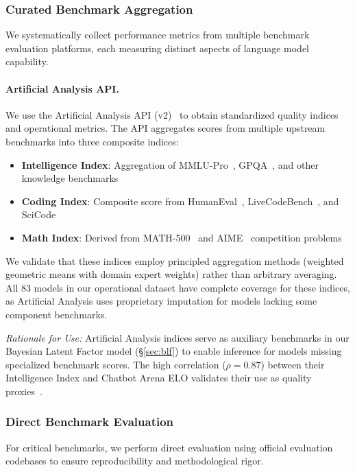 \subsubsection{Curated Benchmark Aggregation}

We systematically collect performance metrics from multiple benchmark evaluation platforms, each measuring distinct aspects of language model capability.

\paragraph{Artificial Analysis API.}
We use the Artificial Analysis API (v2)~\cite{artificialanalysis2024} to obtain standardized quality indices and operational metrics. The API aggregates scores from multiple upstream benchmarks into three composite indices:
%
\begin{itemize}[nosep]
    \item \textbf{Intelligence Index}: Aggregation of MMLU-Pro~\cite{wang2024mmlu-pro}, GPQA~\cite{rein2023gpqa}, and other knowledge benchmarks
    \item \textbf{Coding Index}: Composite score from HumanEval~\cite{chen2021humaneval}, LiveCodeBench~\cite{jain2024livecodebench}, and SciCode~\cite{tian2024scicode}
    \item \textbf{Math Index}: Derived from MATH-500~\cite{hendrycks2021math} and AIME~\cite{aime2024} competition problems
\end{itemize}
%
We validate that these indices employ principled aggregation methods (weighted geometric means with domain expert weights) rather than arbitrary averaging. All 83 models in our operational dataset have complete coverage for these indices, as Artificial Analysis uses proprietary imputation for models lacking some component benchmarks.

\textit{Rationale for Use:} Artificial Analysis indices serve as auxiliary benchmarks in our Bayesian Latent Factor model (§\ref{sec:blf}) to enable inference for models missing specialized benchmark scores. The high correlation ($\rho = 0.87$) between their Intelligence Index and Chatbot Arena ELO validates their use as quality proxies~\cite{artificialanalysis2024validation}.

\subsubsection{Direct Benchmark Evaluation}

For critical benchmarks, we perform direct evaluation using official evaluation codebases to ensure reproducibility and methodological rigor.

